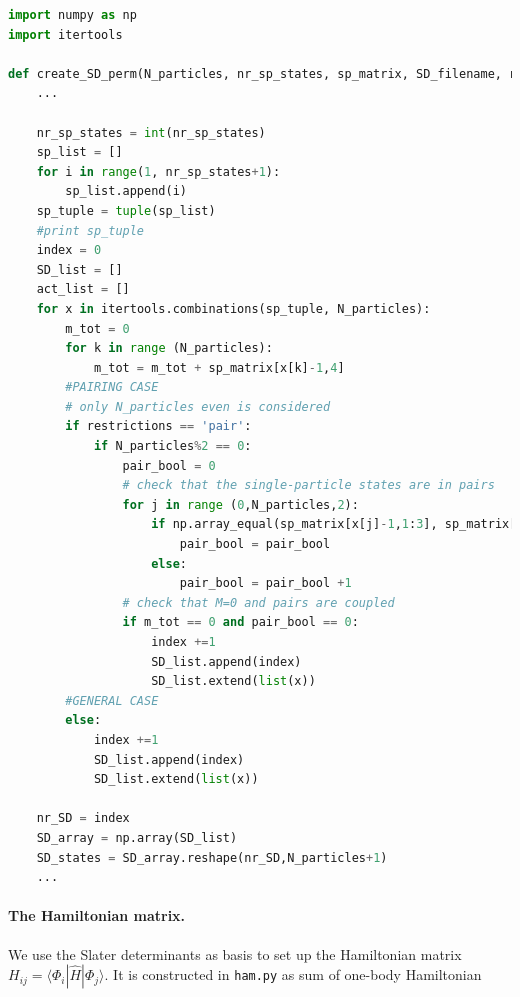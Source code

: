 \documentclass[twoside]{article}
\newcommand{\bra}[1]{\langle #1 |}
\newcommand{\ket}[1]{| #1 \rangle}
\begin{document}
\begin{lstlisting}[language=Python,label=create_SD,caption=The function \texttt{create\_SD\_perm} in the file \texttt{create\_table\_files.py} uses the Python function \texttt{itertools.combinations(,)} to create all the possible Slater determinants. In the case of the pairing model the Slater determinants are restricted to the ones with $\protect{M=0}$ and coupled pairs of single-particle states.]
import numpy as np
import itertools

def create_SD_perm(N_particles, nr_sp_states, sp_matrix, SD_filename, restrictions=''): 
    ...

    nr_sp_states = int(nr_sp_states)
    sp_list = []
    for i in range(1, nr_sp_states+1):
        sp_list.append(i)
    sp_tuple = tuple(sp_list)
    #print sp_tuple
    index = 0
    SD_list = []
    act_list = []
    for x in itertools.combinations(sp_tuple, N_particles):
        m_tot = 0
        for k in range (N_particles):
            m_tot = m_tot + sp_matrix[x[k]-1,4]
        #PAIRING CASE
        # only N_particles even is considered
        if restrictions == 'pair':
            if N_particles%2 == 0:
                pair_bool = 0
                # check that the single-particle states are in pairs
                for j in range (0,N_particles,2):
                    if np.array_equal(sp_matrix[x[j]-1,1:3], sp_matrix[x[j+1]-1,1:3]):
                        pair_bool = pair_bool 
                    else:
                        pair_bool = pair_bool +1
                # check that M=0 and pairs are coupled
                if m_tot == 0 and pair_bool == 0:
                    index +=1
                    SD_list.append(index)
                    SD_list.extend(list(x))
        #GENERAL CASE
        else:
            index +=1
            SD_list.append(index)
            SD_list.extend(list(x))
    
    nr_SD = index
    SD_array = np.array(SD_list)
    SD_states = SD_array.reshape(nr_SD,N_particles+1)
    ...

\end{lstlisting}


\paragraph{The Hamiltonian matrix.} We use the Slater determinants as basis to set up the Hamiltonian matrix $H_{ij}=\bra{\Phi_i} \hat H \ket{\Phi_j}$. It is constructed in \texttt{ham.py} as sum of one-body Hamiltonian
\end{document}
